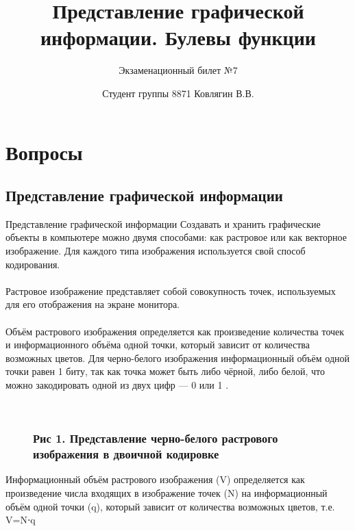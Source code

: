 \documentclass{beamer}
\title{Представление графической информации. Булевы функции}
\subtitle{Экзаменационный билет №7}
\author{Студент группы 8871 Ковлягин В.В.}
\begin{document}
\parindent=1cm
  \frame{\maketitle}
    \section{Вопросы}
    \subsection{Представление графической информации}
    \begin{frame}{Представление графической информации}
        Создавать и хранить графические объекты в компьютере можно двумя способами: как растровое или как векторное изображение.
     Для каждого типа изображения используется свой способ кодирования.\\
   \\
     Растровое изображение представляет собой совокупность точек, используемых для его отображения на экране монитора.\\
    \\
     Объём растрового изображения определяется как произведение количества точек и информационного объёма одной точки, который зависит от количества возможных цветов. Для черно-белого изображения информационный объём одной точки равен  1  биту, так как точка может быть либо чёрной, либо белой, что можно закодировать одной из двух цифр —  0  или  1 .
    \end{frame}
\begin{figure}[H]
\begin{center}
\begin{minipage}[h]{0.65\linewidth}
  \\
\frametitle{ Рис 1. Представление черно-белого растрового изображения в двоичной кодировке}
\end{minipage}
\end{center}
\end{figure}
Информационный объём растрового изображения (V) определяется как произведение числа входящих в изображение точек (N) на информационный объём одной точки (q), который зависит от количества возможных цветов, т.е. V=N⋅q\\
\end{document}
